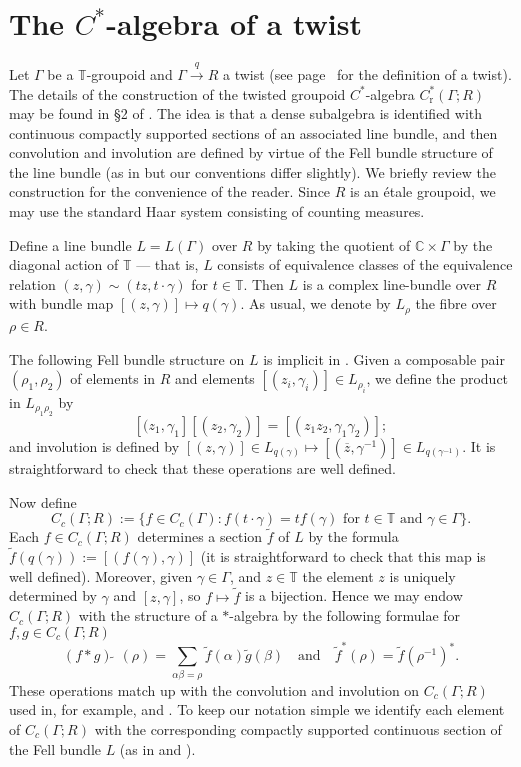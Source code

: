 \documentclass[12pt,a4paper]{amsart}
\newcommand{\field}[1]{\mathbb{#1}}
\newcommand{\CC}{\field{C}}
\newcommand{\TT}{\field{T}}
\newcommand{\red}{\operatorname{r}}
\newcommand{\tgcsa}[2]{\ensuremath{C^*_{\red}(#1 ; #2)}}
\begin{document}
\appendix\section{The \texorpdfstring{$C^*$}{C*}-algebra of a twist}

Let $\Gamma$ be a $\TT$-groupoid and $ \Gamma \stackrel{q}{\to}
R $ a twist (see page~\pageref{defn twist} for the definition
of a twist).  The details of the construction of the twisted
groupoid $C^*$-algebra $\tgcsa{\Gamma}{R}$ may be found in \S2
of \cite{Kumjian1986}. The idea is that a dense subalgebra is
identified with continuous compactly supported sections of an
associated line bundle, and then convolution and involution are
defined by virtue of the Fell bundle structure of the line
bundle (as in \cite[\S{5}]{Renault2008} but our conventions
differ slightly). We briefly review the construction for the
convenience of the reader. Since $R$ is an \'etale groupoid, we
may use the standard Haar system consisting of counting
measures.

Define a line bundle $L = L(\Gamma)$ over $R$ by taking the
quotient of $\CC \times \Gamma$ by the diagonal action of $\TT$
--- that is, $L$ consists of equivalence classes of the
equivalence relation $(z,\gamma)\sim(tz, t\cdot\gamma)$ for
$t\in\TT$. Then $L$ is a complex line-bundle over $R$ with
bundle map $[(z,\gamma)] \mapsto q(\gamma)$. As usual, we denote
by $L_\rho$ the fibre over $\rho \in R$.

The following Fell bundle structure on $L$ is implicit in
\cite{Kumjian1986}. Given a composable pair $(\rho_1, \rho_2)$
of elements in $R$ and elements $[(z_i,\gamma_i)] \in
L_{\rho_i}$, we define the product in $L_{\rho_1\rho_2}$ by
\[
[(z_1,\gamma_1][(z_2,\gamma_2)] = [(z_1z_2,\gamma_1\gamma_2)];
\]
and involution is defined by $[(z,\gamma)] \in L_{q(\gamma)}
\mapsto [(\overline{z},\gamma^{-1})] \in L_{q(\gamma^{-1})}$.
It is straightforward to check that these operations are
well defined.

Now define
\[
C_c(\Gamma; R):=\{f\in C_c(\Gamma): f(t\cdot\gamma)
    = tf(\gamma)\text{\ for $t\in\TT$ and $\gamma\in \Gamma$}\}.
\]
Each $f \in C_c(\Gamma;R)$ determines a section $\tilde{f}$ of
$L$ by the formula $\tilde{f}(q(\gamma)) :=
[(f(\gamma),\gamma)]$ (it is straightforward to check that this
map is well defined). Moreover, given $\gamma \in \Gamma$, and
$z \in \TT$ the element $z$ is uniquely determined by $\gamma$
and $[z,\gamma]$, so $f \mapsto \tilde{f}$ is a bijection.
Hence we may endow $C_c(\Gamma; R)$ with the structure of a
$*$-algebra by the following formulae for $f, g \in C_c(\Gamma;
R)$
\[
(f*g)\widetilde{\ }\;(\rho)
    = \sum_{\alpha\beta = \rho} \tilde{f}(\alpha)\tilde{g}(\beta)
\quad\text{and}\quad
    \widetilde{f}^*(\rho) = \tilde{f}(\rho^{-1})^*.
\]
These operations match up with the convolution and involution
on $C_c(\Gamma;R)$ used in, for example, \cite{MW1992} and
\cite{Renault2008}. To keep our notation simple we identify
each element of $C_c(\Gamma;R)$ with the corresponding
compactly supported continuous section of the Fell bundle $L$
(as in \cite{Kumjian1986} and \cite{Renault2008}).
\end{document}
